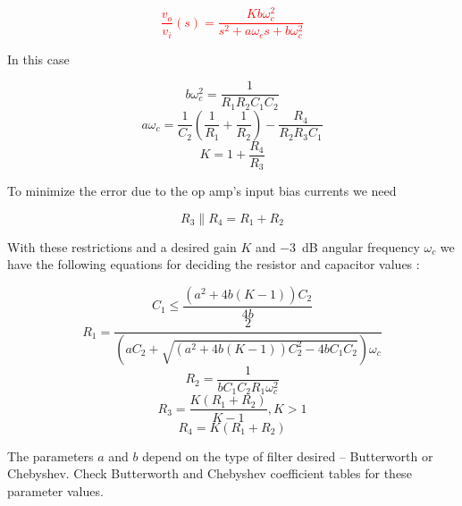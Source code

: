 \textcolor{red}{
\begin{equation}
\frac{v_{o}}{v_{i}}(s) = \frac{Kb\omega_{c}^{2}}{s^{2} + a\omega_{c}s + b\omega_{c}^{2}}
\label{eq:2ndorder_vcvs_LPfilter}
\end{equation}
}

In this case

\begin{equation}
b\omega_{c}^{2} = \frac{1}{R_{1}R_{2}C_{1}C_{2}}
\end{equation}
\begin{equation}
a\omega_{c} = \frac{1}{C_{2}}\left(\frac{1}{R_{1}} + \frac{1}{R_{2}}\right) - \frac{R_{4}}{R_{2}R_{3}C_{1}}
\end{equation}
\begin{equation}
K = 1 + \frac{R_{4}}{R_{3}}
\end{equation}

To minimize the error due to the op amp's input bias currents we need

\begin{equation}
R_3 \parallel R_4 = R_1 + R_2
\end{equation}

With these restrictions and a desired gain $K$ and \SI{-3}{\dB} angular frequency $\omega_{c}$ we have the following equations for deciding the resistor and capacitor values \autocite[118-119]{op-amp-circuits-johnson}:

\begin{equation}
C_1 \leq \frac{(a^2+4b(K-1))C_2}{4b}
\end{equation}
\begin{equation}
R_1 = \frac{2}{(aC_2+\sqrt{(a^2+4b(K-1))C_2^2 - 4b C_1 C_2})\omega_{c}}
\end{equation}
\begin{equation}
R_2 = \frac{1}{bC_1 C_2 R_1\omega_{c}^2}
\end{equation}
\begin{equation}
R_3 = \frac{K(R_1 + R_2)}{K-1}, K > 1
\end{equation}
\begin{equation}
R_4 = K(R_1 + R_2)
\end{equation}

The parameters $a$ and $b$ depend on the type of filter desired -- Butterworth or Chebyshev.
Check Butterworth and Chebyshev coefficient tables for these parameter values.

